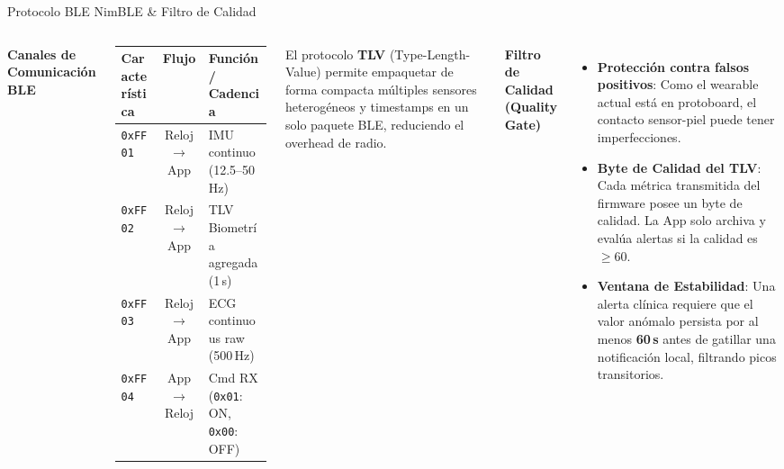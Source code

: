 \documentclass[aspectratio=169, 10pt]{beamer}
\begin{document}
\begin{frame}{Protocolo BLE NimBLE \& Filtro de Calidad}
    \begin{columns}[T]
        \footnotesize
        \textbf{Canales de Comunicaci\'on BLE}
        \vspace{0.1cm}
        
        \scriptsize
        \begin{tabular}{l c l}
            \toprule
            \textbf{Caracter\'istica} & \textbf{Flujo} & \textbf{Funci\'on / Cadencia} \\
            \midrule
            \texttt{0xFF01} & Reloj \(\to\) App & IMU continuo (12.5--50\,Hz) \\
            \texttt{0xFF02} & Reloj \(\to\) App & TLV Biometr\'ia agregada (1\,s) \\
            \texttt{0xFF03} & Reloj \(\to\) App & ECG continuous raw (500\,Hz) \\
            \texttt{0xFF04} & App \(\to\) Reloj & Cmd RX (\texttt{0x01}: ON, \texttt{0x00}: OFF) \\
            \bottomrule
        \end{tabular}
        
        \vspace{0.2cm}
        \footnotesize
        El protocolo \textbf{TLV} (Type-Length-Value) permite empaquetar de forma compacta m\'ultiples sensores heterog\'eneos y timestamps en un solo paquete BLE, reduciendo el overhead de radio.
        
        \footnotesize
        \textbf{Filtro de Calidad (Quality Gate)}
        \begin{itemize}\itemsep0.1cm
            \item \textbf{Protecci\'on contra falsos positivos}: Como el wearable actual está en protoboard, el contacto sensor-piel puede tener imperfecciones.
            \item \textbf{Byte de Calidad del TLV}: Cada m\'etrica transmitida del firmware posee un byte de calidad. La App solo archiva y eval\'ua alertas si la calidad es \(\ge 60\).
            \item \textbf{Ventana de Estabilidad}: Una alerta cl\'inica requiere que el valor an\'omalo persista por al menos \textbf{60\,s} antes de gatillar una notificaci\'on local, filtrando picos transitorios.
        \end{itemize}
    \end{columns}
\end{frame}
\end{document}
